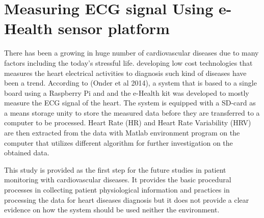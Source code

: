 \section{Measuring ECG signal Using e-Health sensor platform}

There has been a growing in huge number of cardiovascular diseases due to many factors including the today’s stressful life. developing low cost technologies that measures the heart electrical activities to diagnosis such kind of diseases have been a trend. According to (Onder et al 2014), a system that is based to a single board using a Raspberry Pi and and the e-Health kit was developed to mostly measure the ECG signal of the heart. The system is equipped with a SD-card as a means storage unity to store the measured data before they are transferred to a computer to be processed. Heart Rate (HR) and Heart Rate Variability (HRV) are then extracted from the data with Matlab environment program on the computer that utilizes different algorithm for further investigation on the obtained data\cite{Measuring2014ecg}. 

This study is provided as the first step for the future studies in patient monitoring with cardiovascular diseases. It provides the basic procedural processes in collecting patient physiological information and practices in processing the data for heart diseases diagnosis but it does not provide a clear evidence on how the system should be used neither the environment.